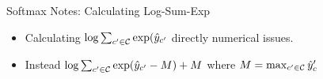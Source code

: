 \documentclass{beamer}
\begin{document}
\begin{frame}{Softmax Notes: Calculating Log-Sum-Exp}
  \begin{itemize}
  \item Calculating $\log \sum_{c' \in \mathcal{C}} \exp(\hat{y}_{c'}$ directly numerical issues.
  \item Instead $\log \sum_{c' \in \mathcal{C}} \exp(\hat{y}_{c'} - M) + M$ where $M = \max_{c'\in\mathcal{C}} \hat{y}_c'$ 
  \end{itemize}
\end{frame}
\end{document}
